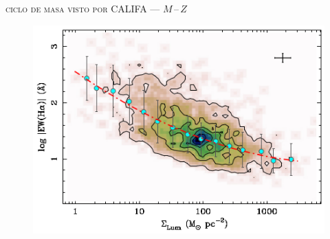 \documentclass[xcolor=dvipsnames,4pt,hyperref={colorlinks,citecolor=black,linkcolor=black,urlcolor=black}]{beamer}
\begin{document}
\begin{frame}{\textsc{ciclo de masa visto por CALIFA --- $M\,$--$\,Z$}}

\begin{figure}
\includegraphics[scale=1]{img/rosales-ortega2012-3}
\end{figure}
\end{frame}
\end{document}
